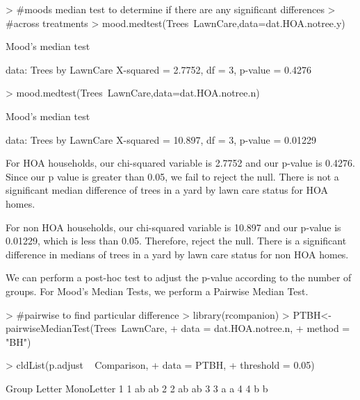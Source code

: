 \documentclass{article}
\begin{document}
\begin{Schunk}
\begin{Sinput}
> #moods median test to determine if there are any significant differences
> #across treatments
> mood.medtest(Trees~LawnCare,data=dat.HOA.notree.y)
\end{Sinput}
\begin{Soutput}
	Mood's median test

data:  Trees by LawnCare
X-squared = 2.7752, df = 3, p-value = 0.4276
\end{Soutput}
\begin{Sinput}
> mood.medtest(Trees~LawnCare,data=dat.HOA.notree.n)
\end{Sinput}
\begin{Soutput}
	Mood's median test

data:  Trees by LawnCare
X-squared = 10.897, df = 3, p-value = 0.01229
\end{Soutput}
\end{Schunk}

For HOA households, our chi-squared variable is 2.7752 and our p-value is 0.4276. Since our p value is greater than 0.05, we fail to reject the null. There is not a significant median difference of trees in a yard by lawn care status for HOA homes. 

For non HOA households, our chi-squared variable is 10.897 and our p-value is 0.01229, which is less than 0.05. Therefore, reject the null. There is a significant difference in medians of trees in a yard by lawn care status for non HOA homes. 

We can perform a post-hoc test to adjust the p-value according to the number of groups. For Mood's Median Tests, we perform a Pairwise Median Test. 

\begin{Schunk}
\begin{Sinput}
> #pairwise to find particular difference
> library(rcompanion)
> PTBH<-pairwiseMedianTest(Trees~LawnCare,
+                        data   = dat.HOA.notree.n,
+                        method = "BH")
\end{Sinput}
\end{Schunk}

\begin{Schunk}
\begin{Sinput}
> cldList(p.adjust ~ Comparison,
+         data = PTBH,
+         threshold = 0.05)
\end{Sinput}
\begin{Soutput}
  Group Letter MonoLetter
1     1     ab         ab
2     2     ab         ab
3     3      a         a 
4     4      b          b
\end{Soutput}
\end{Schunk}
\end{document}
